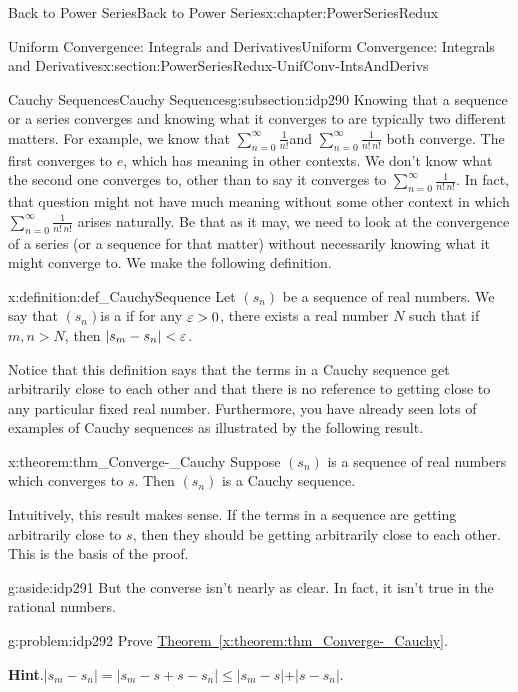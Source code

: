 \begin{chapterptx}{Back to Power Series}{}{Back to Power Series}{}{}{x:chapter:PowerSeriesRedux}
\begin{sectionptx}{Uniform Convergence: Integrals and Derivatives}{}{Uniform Convergence: Integrals and Derivatives}{}{}{x:section:PowerSeriesRedux-UnifConv-IntsAndDerivs}
\begin{subsectionptx}{Cauchy Sequences}{}{Cauchy Sequences}{}{}{g:subsection:idp290}
			Knowing that a sequence or a series converges and knowing what it converges to are typically two different matters. For example, we know that \(\sum_{n=0}^\infty\frac{1}{n!}\)and \(\sum_{n=0}^\infty\frac{1}{n!\,n!}\) both converge. The first converges to \(e\), which has meaning in other contexts. We don't know what the second one converges to, other than to say it converges to \(\sum_{n=0}^\infty\frac{1}{n!\,n!}\). In fact, that question might not have much meaning without some other context in which \(\sum_{n=0}^\infty\frac{1}{n!\,n!}\) arises naturally. Be that as it may, we need to look at the convergence of a series (or a sequence for that matter) without necessarily knowing what it might converge to. We make the following definition.%
			\begin{definition}{}{x:definition:def_CauchySequence}%
				 Let \(\left(s_n\right)\) be a sequence of real numbers. We say that \(\left(s_n\right)\)is a  if for any \(\varepsilon>0\), there exists a real number \(N\) such that if \(m,n>N\), then \(|s_m-s_n|< \varepsilon\).%
			\end{definition}
			Notice that this definition says that the terms in a Cauchy sequence get arbitrarily close to each other and that there is no reference to getting close to any particular fixed real number. Furthermore, you have already seen lots of examples of Cauchy sequences as illustrated by the following result.%
			\begin{theorem}{}{}{x:theorem:thm_Converge-_Cauchy}%
				 Suppose \(\left(s_n\right)\) is a sequence of real numbers which converges to \(s\). Then \(\left(s_n\right)\) is a Cauchy sequence.%
			\end{theorem}
			Intuitively, this result makes sense. If the terms in a sequence are getting arbitrarily close to \(s\), then they should be getting arbitrarily close to each other. This is the basis of the proof.%
			\begin{aside}{}{g:aside:idp291}%
				But the converse isn't nearly as clear. In fact, it isn't true in the rational numbers.%
			\end{aside}
			\begin{problem}{}{g:problem:idp292}%
				Prove \hyperref[x:theorem:thm_Converge-_Cauchy]{Theorem~{\xreffont\ref{x:theorem:thm_Converge-_Cauchy}}}.%
				\par\smallskip%
				\noindent\textbf{\blocktitlefont Hint}.\hypertarget{g:hint:idp293}{}\quad{}\(|s_m-s_n|=|s_m-s+s-s_n|\leq|s_m-s\mathopen|+|s-s_n|\).%

\end{problem}
\end{subsectionptx}
\end{sectionptx}
\end{chapterptx}
